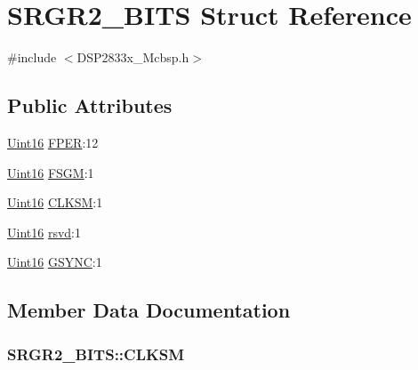 \hypertarget{struct_s_r_g_r2___b_i_t_s}{}\section{S\+R\+G\+R2\+\_\+\+B\+I\+T\+S Struct Reference}
\label{struct_s_r_g_r2___b_i_t_s}


{\ttfamily \#include $<$D\+S\+P2833x\+\_\+\+Mcbsp.\+h$>$}

\subsection*{Public Attributes}
\begin{DoxyCompactItemize}
\item 
\hyperlink{_d_s_p2833x___device_8h_a59a9f6be4562c327cbfb4f7e8e18f08b}{Uint16} \hyperlink{struct_s_r_g_r2___b_i_t_s_abe6462a3a5bc8b6e627136e31b8b7f67}{F\+P\+E\+R}\+:12
\item 
\hyperlink{_d_s_p2833x___device_8h_a59a9f6be4562c327cbfb4f7e8e18f08b}{Uint16} \hyperlink{struct_s_r_g_r2___b_i_t_s_aea1c2a5bd5f03db780280d379c5bcba8}{F\+S\+G\+M}\+:1
\item 
\hyperlink{_d_s_p2833x___device_8h_a59a9f6be4562c327cbfb4f7e8e18f08b}{Uint16} \hyperlink{struct_s_r_g_r2___b_i_t_s_a90eb45ad50814cfcd16a04fcf4cfde63}{C\+L\+K\+S\+M}\+:1
\item 
\hyperlink{_d_s_p2833x___device_8h_a59a9f6be4562c327cbfb4f7e8e18f08b}{Uint16} \hyperlink{struct_s_r_g_r2___b_i_t_s_ad8ea5f38a2aba7d6200c1eba7e6a949a}{rsvd}\+:1
\item 
\hyperlink{_d_s_p2833x___device_8h_a59a9f6be4562c327cbfb4f7e8e18f08b}{Uint16} \hyperlink{struct_s_r_g_r2___b_i_t_s_a7a4c30e857ed364050681bd066d68616}{G\+S\+Y\+N\+C}\+:1
\end{DoxyCompactItemize}


\subsection{Member Data Documentation}
\hypertarget{struct_s_r_g_r2___b_i_t_s_a90eb45ad50814cfcd16a04fcf4cfde63}{}
\subsubsection[{C\+L\+K\+S\+M}]{ S\+R\+G\+R2\+\_\+\+B\+I\+T\+S\+::\+C\+L\+K\+S\+M}\label{struct_s_r_g_r2___b_i_t_s_a90eb45ad50814cfcd16a04fcf4cfde63}
\hypertarget{struct_s_r_g_r2___b_i_t_s_abe6462a3a5bc8b6e627136e31b8b7f67}{}
